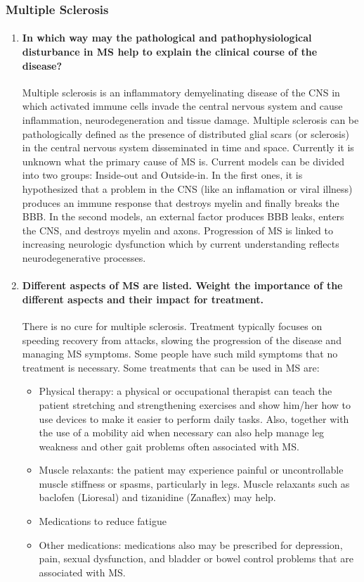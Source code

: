 \documentclass[12pt,article,oneside,a4paper]{memoir}
\begin{document}
\subsubsection{Multiple Sclerosis}
\begin{enumerate}
\item \paragraph{In which way may the pathological and pathophysiological
disturbance in MS help to explain the clinical course of the disease?}

Multiple sclerosis is an inflammatory demyelinating disease of the CNS in which
activated immune cells invade the central nervous system and cause
inflammation, neurodegeneration and tissue damage. Multiple sclerosis can be
pathologically defined as the presence of distributed glial scars (or
sclerosis) in the central nervous system disseminated in time and space.
Currently it is unknown what the primary cause of MS is. Current models can be
divided into two groups: Inside-out and Outside-in. In the first ones, it is
hypothesized that a problem in the CNS (like an inflamation or viral illness)
produces an immune response that destroys myelin and finally breaks the BBB. In
the second models, an external factor produces BBB leaks, enters the CNS, and
destroys myelin and axons. Progression of MS is linked to increasing neurologic
dysfunction which by current understanding reflects neurodegenerative
processes.

\item \paragraph{Different aspects of MS are listed. Weight the importance of
the different aspects and their impact for treatment.}
\label{question:MS-aspects}

There is no cure for multiple sclerosis. Treatment typically focuses on
speeding recovery from attacks, slowing the progression of the disease and
managing MS symptoms. Some people have such mild symptoms that no treatment is
necessary.
Some treatments that can be used in MS are:
\begin{itemize}
\item Physical therapy: a physical or occupational therapist can teach the
patient stretching and strengthening exercises and show him/her how to use
devices to make it easier to perform daily tasks. Also, together with the use
of a mobility aid when necessary can also help manage leg weakness and other
gait problems often associated with MS.
\item Muscle relaxants: the patient may experience painful or uncontrollable
muscle stiffness or spasms, particularly in legs. Muscle relaxants such as
baclofen (Lioresal) and tizanidine (Zanaflex) may help.
\item Medications to reduce fatigue
\item Other medications: medications also may be prescribed for depression,
pain, sexual dysfunction, and bladder or bowel control problems that are
associated with MS.
\end{itemize}


\end{enumerate}
\end{document}
